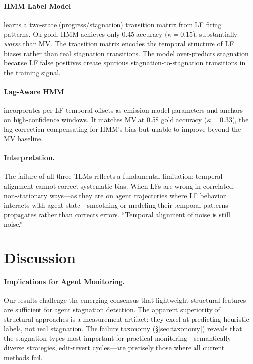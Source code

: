\documentclass[11pt]{article}
\begin{document}
\paragraph{HMM Label Model} learns a two-state (progress/stagnation) transition matrix from LF firing patterns. On gold, HMM achieves only 0.45 accuracy ($\kappa{=}0.15$), substantially \emph{worse} than MV. The transition matrix encodes the temporal structure of LF biases rather than real stagnation transitions. The model over-predicts stagnation because LF false positives create spurious stagnation-to-stagnation transitions in the training signal.

\paragraph{Lag-Aware HMM} incorporates per-LF temporal offsets as emission model parameters and anchors on high-confidence windows. It matches MV at 0.58 gold accuracy ($\kappa{=}0.33$), the lag correction compensating for HMM's bias but unable to improve beyond the MV baseline.

\paragraph{Interpretation.} The failure of all three TLMs reflects a fundamental limitation: temporal alignment cannot correct systematic bias. When LFs are wrong in correlated, non-stationary ways---as they are on agent trajectories where LF behavior interacts with agent state---smoothing or modeling their temporal patterns propagates rather than corrects errors. ``Temporal alignment of noise is still noise.''

\section{Discussion}

\paragraph{Implications for Agent Monitoring.}
Our results challenge the emerging consensus that lightweight structural features are sufficient for agent stagnation detection. The apparent superiority of structural approaches is a measurement artifact: they excel at predicting heuristic labels, not real stagnation. The failure taxonomy (\S\ref{sec:taxonomy}) reveals that the stagnation types most important for practical monitoring---semantically diverse strategies, edit-revert cycles---are precisely those where all current methods fail.
\end{document}
